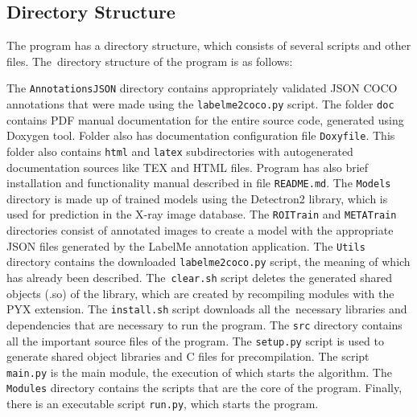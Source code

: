 \subsection{Directory Structure}
The program has a directory structure, which consists of several scripts and other files. The~directory structure of the program is as follows:
\vspace{1mm}

The \texttt{Annotations\textunderscore JSON} directory contains appropriately validated JSON COCO annotations that were made using the \texttt{labelme2coco.py} script. The folder \texttt{doc} contains PDF manual documentation for the entire source code, generated using Doxygen tool. Folder also has documentation configuration file \texttt{Doxyfile}. This folder also contains \texttt{html} and \texttt{latex} subdirectories with autogenerated documentation sources like TEX and HTML files. Program has also brief installation and functionality manual described in file \texttt{README.md}. The \texttt {Models} directory is made up of trained models using the Detectron2 library, which is used for prediction in the X-ray image database. The \texttt {ROI\textunderscore Train} and \texttt {META\textunderscore Train} directories consist of annotated images to create a model with the appropriate JSON files generated by the LabelMe annotation application. The \texttt {Utils} directory contains the downloaded \texttt {labelme2coco.py} script, the meaning of which has already been described. The~\texttt{clear.sh} script deletes the generated shared objects (.so) of the library, which are created by recompiling modules with the PYX extension. The \texttt {install.sh} script downloads all the~necessary libraries and dependencies that are necessary to run the program. The \texttt{src} directory contains all the important source files of the program. The \texttt {setup.py} script is used to generate shared object libraries and C files for precompilation. The script \texttt {main.py} is the main module, the execution of which starts the algorithm. The \texttt {Modules} directory contains the scripts that are the core of the program. Finally, there is an executable script \texttt {run.py}, which starts the program.


